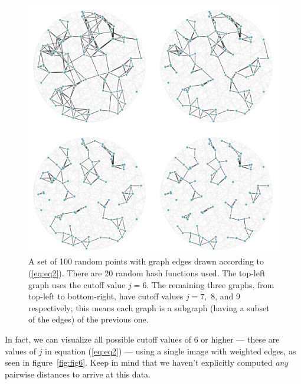 \documentclass[20pt,]{extarticle}
\begin{document}
\begin{figure}
\centering
\includegraphics{images/lsh_image5.png}
\caption{A set of 100 random points with graph edges drawn according to
(\ref{eq:eq2}). There are 20 random hash functions used. The top-left
graph uses the cutoff value \(j=6.\) The remaining three graphs, from
top-left to bottom-right, have cutoff values \(j=7,\) 8, and 9
respectively; this means each graph is a subgraph (having a subset of
the edges) of the previous one.}\label{fig:fig5}
\end{figure}

In fact, we can visualize all possible cutoff values of 6 or higher ---
these are values of \(j\) in equation (\ref{eq:eq2}) --- using a single
image with weighted edges, as seen in figure~\ref{fig:fig6}. Keep in
mind that we haven't explicitly computed \emph{any} pairwise distances
to arrive at this data.
\end{document}
